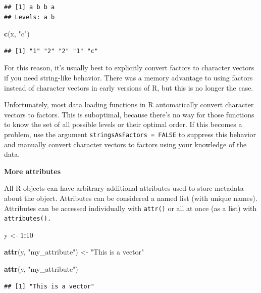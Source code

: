 \documentclass[
]{book}
\newenvironment{Shaded}{\begin{snugshade}}{\end{snugshade}}
\newcommand{\DecValTok}[1]{\textcolor[rgb]{0.00,0.00,0.81}{#1}}
\newcommand{\FunctionTok}[1]{\textcolor[rgb]{0.13,0.29,0.53}{\textbf{#1}}}
\newcommand{\NormalTok}[1]{#1}
\newcommand{\OtherTok}[1]{\textcolor[rgb]{0.56,0.35,0.01}{#1}}
\newcommand{\SpecialCharTok}[1]{\textcolor[rgb]{0.81,0.36,0.00}{\textbf{#1}}}
\newcommand{\StringTok}[1]{\textcolor[rgb]{0.31,0.60,0.02}{#1}}
\begin{document}
\begin{verbatim}
## [1] a b b a
## Levels: a b
\end{verbatim}

\begin{Shaded}
\begin{Highlighting}[]
\FunctionTok{c}\NormalTok{(x, }\StringTok{"c"}\NormalTok{)}
\end{Highlighting}
\end{Shaded}

\begin{verbatim}
## [1] "1" "2" "2" "1" "c"
\end{verbatim}

For this reason, it's usually best to explicitly convert factors to character vectors if you need string-like behavior. There was a memory advantage to using factors instead of character vectors in early versions of R, but this is no longer the case.

Unfortunately, most data loading functions in R automatically convert character vectors to factors. This is suboptimal, because there's no way for those functions to know the set of all possible levels or their optimal order. If this becomes a problem, use the argument \texttt{stringsAsFactors\ =\ FALSE} to suppress this behavior and manually convert character vectors to factors using your knowledge of the data.

\textbf{More attributes}

All R objects can have arbitrary additional attributes used to store metadata about the object. Attributes can be considered a named list (with unique names). Attributes can be accessed individually with \texttt{attr()} or all at once (as a list) with \texttt{attributes().}

\begin{Shaded}
\begin{Highlighting}[]
\NormalTok{y }\OtherTok{\textless{}{-}} \DecValTok{1}\SpecialCharTok{:}\DecValTok{10}

\FunctionTok{attr}\NormalTok{(y, }\StringTok{"my\_attribute"}\NormalTok{) }\OtherTok{\textless{}{-}} \StringTok{"This is a vector"}

\FunctionTok{attr}\NormalTok{(y, }\StringTok{"my\_attribute"}\NormalTok{)}
\end{Highlighting}
\end{Shaded}

\begin{verbatim}
## [1] "This is a vector"
\end{verbatim}
\end{document}
